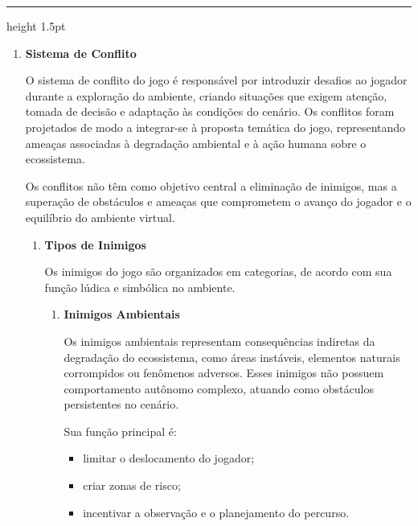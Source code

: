 \documentclass[
oneside,
12pt,                  %
a4paper,               %
brazil,                %
sumario=abnt-6027-2012 %
]{abntex2}
\newenvironment{bloco}{%
	\medskip
	\setlength{\parskip}{1em}
	\setlength{\parindent}{1.25cm}
	\hrule height 1.5pt
	\medskip
}{}
\newcommand{\linhasnatabela}{
}
\begin{document}
\begin{bloco}
\begin{enumerate}[font=\bfseries]
\begin{enumerate}[label=\arabic{enumi}.\arabic*.]
		
		\end{enumerate}%

		\item \textbf{Sistema de Conflito} 
		
		O sistema de conflito do jogo é responsável por introduzir desafios ao jogador durante a exploração do ambiente, criando situações que exigem atenção, tomada de decisão e adaptação às condições do cenário. Os conflitos foram projetados de modo a integrar-se à proposta temática do jogo, representando ameaças associadas à degradação ambiental e à ação humana sobre o ecossistema.
		
		Os conflitos não têm como objetivo central a eliminação de inimigos, mas a superação de obstáculos e ameaças que comprometem o avanço do jogador e o equilíbrio do ambiente virtual.
		
		\begin{enumerate}[label=\textbf{\arabic{enumi}.\arabic*.}]%

		\item \textbf{Tipos de Inimigos} 
		
		Os inimigos do jogo são organizados em categorias, de acordo com sua função lúdica e simbólica no ambiente.
		
		\begin{enumerate}[label=\textbf{\alph*)}]
			\item \textbf{Inimigos Ambientais}
			
			Os inimigos ambientais representam consequências indiretas da degradação do ecossistema, como áreas instáveis, elementos naturais corrompidos ou fenômenos adversos. Esses inimigos não possuem comportamento autônomo complexo, atuando como obstáculos persistentes no cenário.
			
			\noindent Sua função principal é:
			
			\begin{itemize}[itemsep=0pt, parsep=0pt]
				\item limitar o deslocamento do jogador;
				\item criar zonas de risco;
				\item incentivar a observação e o planejamento do percurso.
			\end{itemize}
			
			
			\begin{longtable}{>{\centering\arraybackslash}m{3cm}
					>{\centering\arraybackslash}m{3cm}
					>{\centering\arraybackslash}m{3cm}
					>{\centering\arraybackslash}m{3cm}}
				\linhasnatabela
				

\end{longtable}
\end{enumerate}
\end{enumerate}
\end{enumerate}
\end{bloco}
\end{document}
